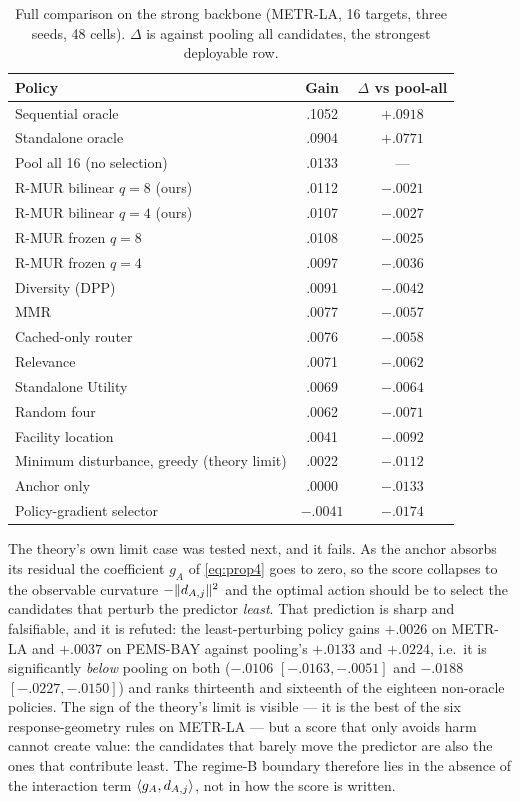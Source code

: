 \begin{table}[t]
 \centering
 \footnotesize
 \caption{Full comparison on the strong backbone (METR-LA, 16 targets, three
 seeds, 48 cells). $\Delta$ is against pooling all candidates, the strongest
 deployable row.}
 \label{tab:leaderboard}
 \begin{tabular}{lcc}
  \toprule
  Policy & Gain & $\Delta$ vs pool-all\\
  \midrule
  Sequential oracle & .1052 & $+.0918$\\
  Standalone oracle & .0904 & $+.0771$\\
  Pool all 16 (no selection) & .0133 & ---\\
  R-MUR bilinear $q{=}8$ (ours) & .0112 & $-.0021$\\
  R-MUR bilinear $q{=}4$ (ours) & .0107 & $-.0027$\\
  R-MUR frozen $q{=}8$ & .0108 & $-.0025$\\
  R-MUR frozen $q{=}4$ & .0097 & $-.0036$\\
  Diversity (DPP) & .0091 & $-.0042$\\
  MMR & .0077 & $-.0057$\\
  Cached-only router & .0076 & $-.0058$\\
  Relevance & .0071 & $-.0062$\\
  Standalone Utility & .0069 & $-.0064$\\
  Random four & .0062 & $-.0071$\\
  Facility location & .0041 & $-.0092$\\
  Minimum disturbance, greedy (theory limit) & .0022 & $-.0112$\\
  Anchor only & .0000 & $-.0133$\\
  Policy-gradient selector & $-.0041$ & $-.0174$\\
  \bottomrule \end{tabular}
\end{table}

The theory's own limit case was tested next, and it fails. As the anchor
absorbs its residual the coefficient $g_A$ of \cref{eq:prop4} goes to zero, so
the score collapses to the observable curvature $-\|d_{A,j}\|^2$ and the optimal
action should be to select the candidates that perturb the predictor
\emph{least}. That prediction is sharp and falsifiable, and it is refuted: the
least-perturbing policy gains $+.0026$ on METR-LA and $+.0037$ on PEMS-BAY
against pooling's $+.0133$ and $+.0224$, i.e.\ it is significantly \emph{below}
pooling on both ($-.0106$ $[-.0163,-.0051]$ and $-.0188$ $[-.0227,-.0150]$) and
ranks thirteenth and sixteenth of the eighteen non-oracle policies. The sign of
the theory's limit is visible --- it is the best of the six response-geometry
rules on METR-LA --- but a score that only avoids harm cannot create value: the
candidates that barely move the predictor are also the ones that contribute
least. The regime-B boundary therefore lies in the absence of the interaction
term $\langle g_A,d_{A,j}\rangle$, not in how the score is written.

